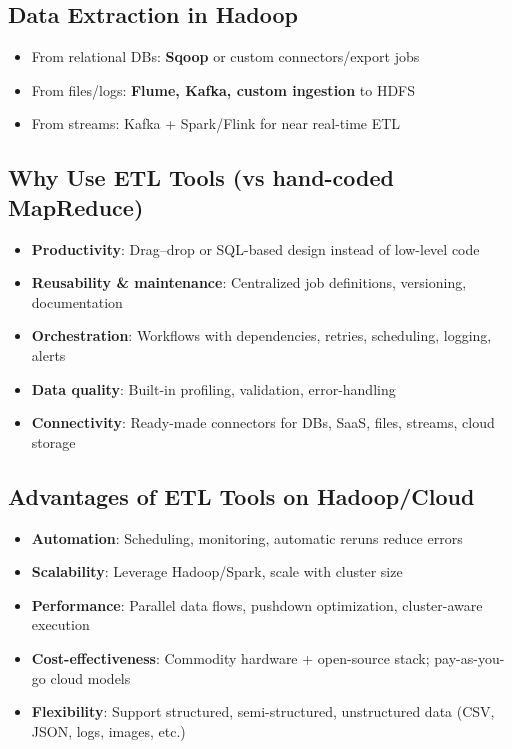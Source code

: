 \documentclass[11pt, onecolumn, a4paper]{article}
\begin{document}
\subsection{Data Extraction in Hadoop}

\begin{itemize}
  \item From relational DBs: \textbf{Sqoop} or custom connectors/export jobs
  \item From files/logs: \textbf{Flume, Kafka, custom ingestion} to HDFS
  \item From streams: Kafka + Spark/Flink for near real-time ETL
\end{itemize}

\subsection{Why Use ETL Tools (vs hand-coded MapReduce)}

\begin{itemize}
  \item \textbf{Productivity}: Drag--drop or SQL-based design instead of low-level code
  \item \textbf{Reusability \& maintenance}: Centralized job definitions, versioning, documentation
  \item \textbf{Orchestration}: Workflows with dependencies, retries, scheduling, logging, alerts
  \item \textbf{Data quality}: Built-in profiling, validation, error-handling
  \item \textbf{Connectivity}: Ready-made connectors for DBs, SaaS, files, streams, cloud storage
\end{itemize}

\subsection{Advantages of ETL Tools on Hadoop/Cloud}

\begin{itemize}
  \item \textbf{Automation}: Scheduling, monitoring, automatic reruns reduce errors
  \item \textbf{Scalability}: Leverage Hadoop/Spark, scale with cluster size
  \item \textbf{Performance}: Parallel data flows, pushdown optimization, cluster-aware execution
  \item \textbf{Cost-effectiveness}: Commodity hardware + open-source stack; pay-as-you-go cloud models
  \item \textbf{Flexibility}: Support structured, semi-structured, unstructured data (CSV, JSON, logs, images, etc.)
\end{itemize}
\end{document}
